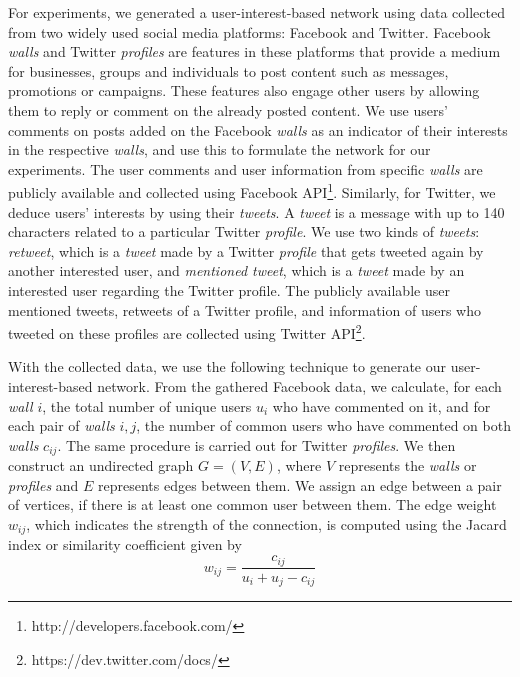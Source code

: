 For experiments, we generated a user-interest-based network using data collected from 
two widely used social media platforms: Facebook and Twitter.
Facebook {\it walls} and Twitter {\it profiles} are features in these platforms that provide a medium for businesses, groups and individuals to post content such as messages, promotions or campaigns. These features also engage other users by allowing them to reply or comment on the already posted content. We use users' comments on posts added on the Facebook {\it walls} as an indicator of their interests in the respective 
{\it walls}, and use this to formulate the network for our experiments. The user comments and user information from specific {\it walls} are publicly available and collected using Facebook API\footnote[3]{http://developers.facebook.com/}. Similarly, for Twitter, we deduce users' interests by using their {\it tweets}. 
A {\it tweet} is a message with up to 140 characters related to a particular Twitter {\it profile}. We use two kinds of {\it tweets}: {\it retweet}, which is a {\it tweet} made by a Twitter {\it profile} that gets tweeted again by another interested user, and {\it mentioned tweet}, which is a {\it tweet} made by an interested user regarding the Twitter profile. The publicly available user mentioned tweets, retweets of a Twitter profile, and information of users who tweeted on these profiles are collected using Twitter API\footnote[4]{https://dev.twitter.com/docs/}.



With the collected data, we use the following technique to generate our user-interest-based network. From the gathered Facebook data, we calculate, for each {\it wall} $i$, the total number of unique users $u_i$ who have commented on it, and for each pair of {\it walls} $i, j$, the number of common users who have commented on both {\it walls} $c_{ij}$. The same procedure is carried out for Twitter {\it profiles}. We then construct an undirected graph $G = (V,E)$, where $V$ represents the {\it walls} or {\it profiles} and $E$ represents edges between them. We assign an edge between a pair of vertices, if there is at least one common user between them. The edge weight $w_{ij}$, which indicates the strength of the connection, is computed using the 
Jacard index or similarity coefficient \cite{Leydesdorff} given by
\[w_{ij} = \frac{c_{ij}}{u_i+u_j-c_{ij}}\]

